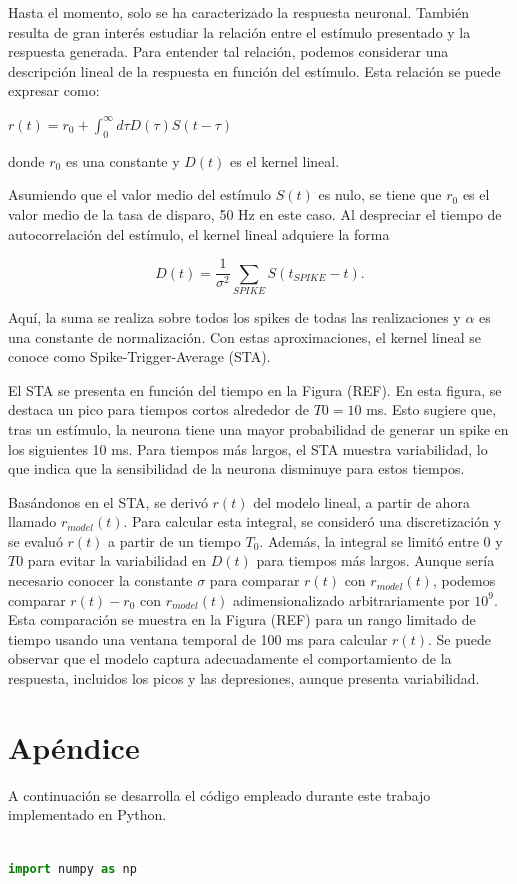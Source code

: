 \documentclass[aps,prb,twocolumn,superscriptaddress,floatfix,longbibliography]{revtex4-2}
\newcounter{para}
\begin{document}
Hasta el momento, solo se ha caracterizado la respuesta neuronal. También resulta de gran interés estudiar la relación entre el estímulo presentado y la respuesta generada. Para entender tal relación, podemos considerar una descripción lineal de la respuesta en función del estímulo. Esta relación se puede expresar como:

$r(t) = r_0 + \int_0^\infty d\tau D(\tau) S(t - \tau)$

donde \( r_0 \) es una constante y \( D(t) \) es el kernel lineal.


Asumiendo que el valor medio del estímulo $S(t)$ es nulo, se tiene que $r_0$ es el valor medio de la tasa de disparo, 50 Hz en este caso. Al despreciar el tiempo de autocorrelación del estímulo, el kernel lineal adquiere la forma

\[D(t) = \frac{1}{\sigma^2} \sum_{SPIKE} S(t_{SPIKE} - t).\]

Aquí, la suma se realiza sobre todos los spikes de todas las realizaciones y \( \alpha \) es una constante de normalización. Con estas aproximaciones, el kernel lineal se conoce como Spike-Trigger-Average (STA).


El STA se presenta en función del tiempo en la Figura (REF). En esta figura, se destaca un pico para tiempos cortos alrededor de \( T0 = 10 \) ms. Esto sugiere que, tras un estímulo, la neurona tiene una mayor probabilidad de generar un spike en los siguientes 10 ms. Para tiempos más largos, el STA muestra variabilidad, lo que indica que la sensibilidad de la neurona disminuye para estos tiempos.

Basándonos en el STA, se derivó \( r(t) \) del modelo lineal, a partir de ahora llamado \( r_{model}(t) \). Para calcular esta integral, se consideró una discretización y se evaluó \( r(t) \) a partir de un tiempo \( T_0 \). Además, la integral se limitó entre 0 y \( T0 \) para evitar la variabilidad en \( D(t) \) para tiempos más largos. Aunque sería necesario conocer la constante \( \sigma \) para comparar \( r(t) \) con \( r_{model}(t) \), podemos comparar \( r(t) - r_0 \) con \( r_{model}(t) \) adimensionalizado arbitrariamente por \( 10^9 \). Esta comparación se muestra en la Figura (REF) para un rango limitado de tiempo usando una ventana temporal de 100 ms para calcular \( r(t) \). Se puede observar que el modelo captura adecuadamente el comportamiento de la respuesta, incluidos los picos y las depresiones, aunque presenta variabilidad.



\onecolumngrid

\section{Apéndice}

A continuación se desarrolla el código empleado durante este trabajo implementado en Python.

\begin{lstlisting}[language=Python]

import numpy as np


\end{lstlisting}


\end{document}
